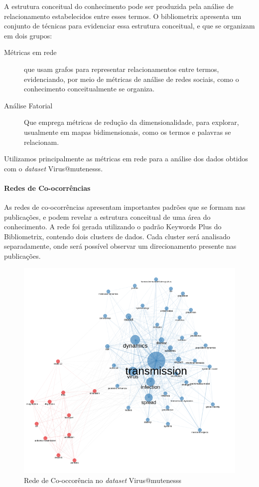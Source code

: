 A estrutura conceitual do conhecimento pode ser produzida pela análise de relacionamento estabelecidos entre esses termos. O bibliometrix apresenta um conjunto de técnicas para evidenciar essa estrutura conceitual, e que se organizam em dois grupos:
\begin{description}
     \item [Métricas em rede] que usam grafos para representar relacionamentos entre termos, evidenciando, por meio de métricas de análise de redes sociais, como o conhecimento conceitualmente se organiza.
     \item [Análise Fatorial] Que emprega métricas de redução da dimensionalidade, para explorar, usualmente em mapas bidimensionais, como os termos e palavras se relacionam. 
 \end{description}

 Utilizamos principalmente as métricas em rede para a análise dos dados obtidos com o \textit{dataset} Virus@mutenesss.

 \paragraph{Redes de Co-ocorrências}

 As redes de co-ocorrências apresentam importantes padrões que se formam nas publicações, e podem revelar a estrutura conceitual de uma área do conhecimento.
 A rede foi gerada utilizando o padrão Keywords Plus do Bibliometrix, contendo dois clusters de dados. Cada cluster será analisado separadamente, onde será possível observar um direcionamento presente nas publicações.

\begin{figure}[H]
    \centering
    \includegraphics[width=1\textwidth]{exploratory-data-analysis/mutenesss/Virus/20221128/img/Keywordplus_clustering.png}
    \caption{Rede de Co-occorência no \textit{dataset} Virus@mutenesss}
    \label{fig:Coocurrence:Virus@mutenesss}
\end{figure}

